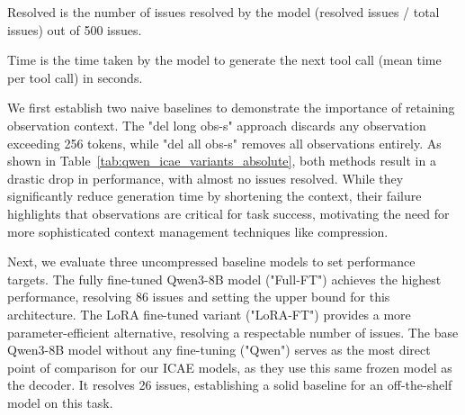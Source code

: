 Resolved is the number of issues resolved by the model (resolved issues / total issues) out of 500 issues.

Time is the time taken by the model to generate the next tool call (mean time per tool call) in seconds.



We first establish two naive baselines to demonstrate the importance of retaining observation context.
The "del long obs-s" approach discards any observation exceeding 256 tokens, while "del all obs-s" removes all observations entirely.
As shown in Table~\ref{tab:qwen_icae_variants_absolute}, both methods result in a drastic drop in performance, with almost no issues resolved.
While they significantly reduce generation time by shortening the context, their failure highlights that observations are critical for task success, motivating the need for more sophisticated context management techniques like compression.

Next, we evaluate three uncompressed baseline models to set performance targets.
The fully fine-tuned Qwen3-8B model ("Full-FT") achieves the highest performance, resolving 86 issues and setting the upper bound for this architecture.
The LoRA fine-tuned variant ("LoRA-FT") provides a more parameter-efficient alternative, resolving a respectable number of issues.
The base Qwen3-8B model without any fine-tuning ("Qwen") serves as the most direct point of comparison for our ICAE models, as they use this same frozen model as the decoder.
It resolves 26 issues, establishing a solid baseline for an off-the-shelf model on this task.

